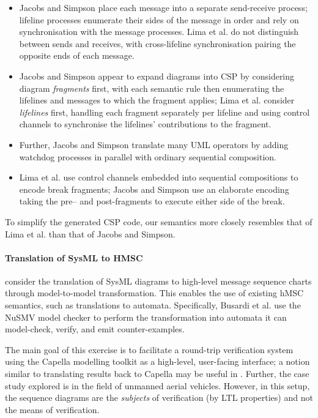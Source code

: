 \begin{itemize}
\item
  Jacobs and Simpson place each message into a
  separate send-receive process; lifeline processes enumerate their
  sides of the message in order and rely on
  synchronisation with the message processes.
  Lima et al. do not
  distinguish between sends and receives, with
  cross-lifeline synchronisation pairing the opposite
  ends of each message.
\item
  Jacobs and Simpson appear to expand diagrams into CSP by
  considering diagram \emph{fragments} first, with each semantic rule
  then enumerating the lifelines and messages to which the fragment applies;
  Lima et al. consider \emph{lifelines} first, handling each fragment
  separately per lifeline and using control channels to synchronise the
  lifelines' contributions to the fragment.
\item
  Further, Jacobs and Simpson translate many UML operators by adding watchdog
  processes in parallel with ordinary sequential composition.
\item
  Lima et al. use control channels embedded into sequential compositions to
  encode break fragments;
  Jacobs and Simpson use an elaborate encoding taking the pre-- and
  post-fragments to execute either side of the break.
\end{itemize}

To simplify the generated CSP code, our semantics more closely resembles that of
Lima et al. than that of Jacobs and Simpson.

\paragraph{Translation of SysML to HMSC}

\textcite{Busard21-SDviaHMSC} consider the translation of SysML diagrams to high-level message sequence
charts through model-to-model transformation.  This enables
the use of existing hMSC semantics, such as translations to
automata.  Specifically, Busardi et al. use the NuSMV model
checker to perform the transformation into automata it can
model-check, verify, and emit counter-examples.

The main goal of this exercise is to facilitate a round-trip
verification system using the Capella modelling toolkit as a
high-level, user-facing interface; a notion similar to translating results
back to Capella may be useful in \langname.  Further, the case study explored is
in the field of unmanned aerial vehicles.
However, in this setup, the
sequence diagrams are the \emph{subjects} of verification (by LTL properties)
and not the means of verification.

